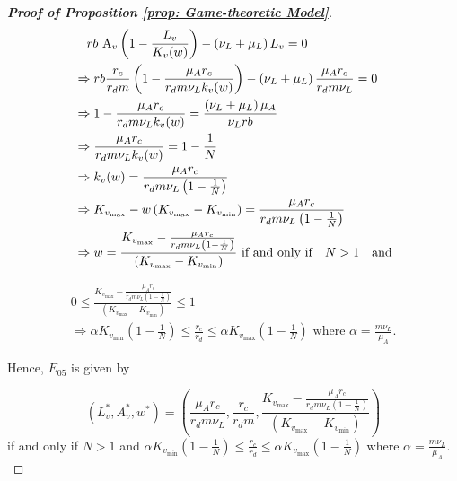 \documentclass{article}
\theoremstyle{remark}
\theoremstyle{custom} %
\begin{document}
\begin{proof} [\textbf{Proof of Proposition \ref{prop: Game-theoretic Model}}]
$$
\begin{aligned}
& \quad r  b  \mathrm{~A}_v\left(1-\frac{L_v}{K_v(w)}\right)-\left(\nu_L+\mu_L\right) L_v=0 \\
& \Rightarrow r b \frac{r_c}{r_d m}\left(1-\frac{\mu_A r_c}{r_d m \nu_L k_v(w)}\right)-\left(\nu_L+\mu_L\right) \frac{\mu_A r_c}{r_d m \nu_L}=0 \\
& \Rightarrow 1-\frac{\mu_A  r_c}{r_d m \nu_L  k_v(w)}=\frac{\left(\nu_L+\mu_L\right) \mu_A}{\nu_L r b} \\
& \Rightarrow \frac{\mu_A  r_c}{r_d  m \nu_L k_v(w)}=1-\frac{1}{N} \\
& \Rightarrow k_v(w)=\frac{\mu_A r_c}{r_d m\nu_L\left(1-\frac{1}{N}\right)} \\
& \Rightarrow K_{v_{\max }}-w\left(K_{v_{\max }}-K_{v_{\min }}\right)=\frac{\mu_A  r_c}{r_d  m \nu_L\left(1-\frac{1}{N}\right)} \\
& \Rightarrow w=\frac{K_{v_{\max }}-\frac{\mu_A r_c}{r_d  m  \nu_L\left(1-\frac{1}{N}\right)}}{\left(K_{v_{\max }}-K_{v_{\min }}\right)} \text { if and only if} \quad N>1 \text \quad {\text{and}}
\end{aligned}
$$

$$
\begin{gathered}
0 \leq \frac{K_{v_{\max }}-\frac{\mu_A r_c}{r_d m \nu_L\left(1-\frac{1}{N}\right)}}{\left(K_{v_{\max }}-K_{v_{\min }}\right)} \leq 1 \\
\Rightarrow \alpha K_{v_{\min }}\left(1-\frac{1}{N}\right) \leq \frac{r_c}{r_d} \leq \alpha K_{v_{\max }}\left(1-\frac{1}{N}\right) \text { where } \alpha=\frac{m \nu_L}{\mu_A}.
\end{gathered}
$$

Hence, $E_{05}$ is given by

$$\left(L_v^*, A_v^*, w^*\right)=\left(\frac{\mu_A  r_c}{r_d  m \nu_L}, \frac{r_c}{r_d  m}, \frac{K_{v_{\max }}-\frac{\mu_A  r_c}{r_d  m \nu_L\left(1-\frac{1}{N}\right)}}{\left(K_{v_{\max }}-K_{v_{\min }}\right)}\right)$$ if and only if $N>1$ and
$\alpha K_{v_{\min }}\left(1-\frac{1}{N}\right) \leq \frac{r_c}{r_d} \leq \alpha K_{v_{\max }}\left(1-\frac{1}{N}\right)$ where $\alpha=\frac{m \nu_L}{\mu_A}.$



\end{proof}
\end{document}
